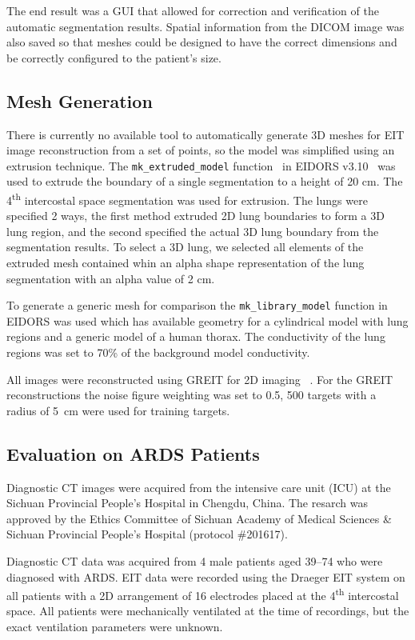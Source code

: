 The end result was a GUI that allowed for correction and verification of the automatic segmentation 
results. Spatial information from the DICOM image was also saved so that meshes could be
designed to have the correct dimensions and be correctly configured to the patient's size.

\subsection{Mesh Generation} \label{sec:mesh-gen}
There is currently no available tool to automatically generate 3D meshes for 
EIT image reconstruction from a set of points, so the model was simplified using an extrusion technique. 
The \verb!mk_extruded_model! 
function~\parencite{grychtol_fem_2013}
in EIDORS v3.10~\parencite{adler_eidors_2017} was used to extrude the boundary 
of a single segmentation to a height of 20 cm.
The 4\textsuperscript{th} intercostal space segmentation was used for extrusion.
The lungs were specified 2 ways, the first method extruded 2D lung boundaries to form a 3D 
lung region, 
and the second specified the actual 3D lung boundary from the segmentation results.  
To select a 3D lung, we selected all elements of the extruded mesh contained whin an 
alpha shape representation of the lung segmentation with an alpha value of 2 cm.

To generate a generic mesh for comparison the \verb!mk_library_model! function in 
EIDORS was used which has available geometry for a cylindrical model with lung regions
and a generic model of a human thorax. The conductivity of the lung regions was set to 
70\% of the background model conductivity.

All images were reconstructed using GREIT for 2D
imaging ~\parencite{adler_greit_2009}. For the GREIT 
reconstructions the noise figure weighting was set to 0.5, 
500 targets with a radius of 5 cm were used for training targets.

\subsection{Evaluation on ARDS Patients} \label{sec:gi-scores}

Diagnostic CT images were acquired from the 
intensive care unit (ICU)
at the Sichuan Provincial People's Hospital
in Chengdu, China.
The resarch was approved
by the Ethics Committee of Sichuan Academy 
of Medical Sciences \& Sichuan Provincial People's Hospital
(protocol \#201617). 

Diagnostic CT data was acquired from 4 male 
patients aged 39--74 who were diagnosed with ARDS.
EIT data were recorded using the Draeger EIT system on all patients
with a 2D arrangement of 16 electrodes placed at the 
4\textsuperscript{th} intercostal space. 
All patients were mechanically ventilated
at the time of recordings, but the exact 
ventilation parameters were unknown.

